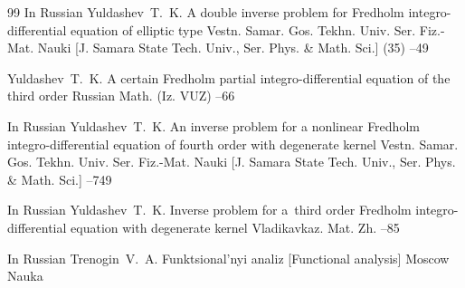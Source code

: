 \begin{thebibliography}{99}
\lang In Russian
\by Yuldashev~T.~K.
\paper A double inverse problem for Fredholm integro-differential equation of elliptic type
\jour  Vestn. Samar. Gos. Tekhn. Univ. Ser. Fiz.-Mat. Nauki \rm [J. Samara State Tech. Univ., Ser. Phys. \& Math. Sci.]
(35)
--49

\by Yuldashev~T.~K.
\paper A certain Fredholm partial integro-differential equation of the third order
\jour Russian Math. (Iz. VUZ)
--66

\lang In Russian
\by Yuldashev~T.~K.
\paper An inverse problem for a nonlinear Fredholm   
integro-differential equation of fourth order with degenerate kernel
\jour  Vestn. Samar. Gos. Tekhn. Univ. Ser. Fiz.-Mat. Nauki \rm [J. Samara State Tech. Univ., Ser. Phys. \& Math. Sci.]
--749

\lang In Russian
\by Yuldashev~T.~K.
\paper Inverse problem for a~third order Fredholm integro-differential equation with degenerate kernel
\jour Vladikavkaz. Mat. Zh.
--85

\lang In Russian
\by Trenogin~V.~A.
\book Funktsional'nyi analiz \rm [Functional analysis]
\publaddr Moscow
\publ Nauka



\end{thebibliography}

\EngDate

\renewcommand{\baselinestretch}{0.9}


